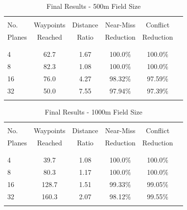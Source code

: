 \documentclass[10pt, conference, compsocconf]{IEEEtran}
\begin{document}
\begin{table}[position here]
\centering
\caption{Final Results - 500m Field Size}
\begin{tabular}{l c c c c c}
\hline
\hline
\\
No.  & Waypoints & Distance & Near-Miss & Conflict \\
Planes& Reached & Ratio & Reduction & Reduction \\\\
\hline
\hline
\\
4 & 62.7 & 1.67 & 100.0$\%$ & 100.0$\%$\\
8 & 82.3 & 1.08 & 100.0$\%$ & 100.0$\%$\\
16 &  76.0 & 4.27 & 98.32$\%$ & 97.59$\%$\\
32 &  50.0 & 7.55 & 97.94$\%$ & 97.39$\%$\\
\\
\hline
\end{tabular}
\label{tab:cc5000}
\end{table}

\begin{table}[position here]
\centering
\caption{Final Results - 1000m Field Size}
\begin{tabular}{l c c c c c}
\hline
\hline
\\
No.  & Waypoints & Distance & Near-Miss & Conflict \\
Planes& Reached & Ratio & Reduction & Reduction \\\\
\hline
\hline
\\
4 & 39.7 & 1.08 & 100.0$\%$ & 100.0$\%$\\
8 & 80.3 & 1.17 & 100.0$\%$ & 100.0$\%$\\
16 &  128.7 & 1.51 & 99.33$\%$ & 99.05$\%$\\
32 &  160.3 & 2.07 & 98.12$\%$ & 99.55$\%$\\
\\
\hline
\end{tabular}
\label{tab:cc1000}
\end{table}
\end{document}
